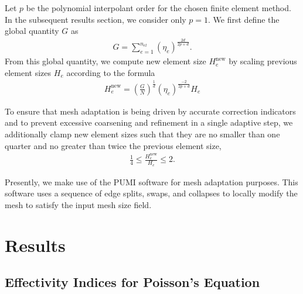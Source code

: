Let $p$ be the polynomial interpolant order for the chosen finite element
method. In the subsequent results section, we consider only $p=1$. We first
define the global quantity $G$ as
%
\begin{gather}
G = \sum_{e=1}^{n_{el}} ( \eta_e ) ^{\frac{2d}{2p+d}}.
\label{eq:refine_global_size}
\end{gather}
%
From this global quantity, we compute new element size $H_e^{\text{new}}$
by scaling previous element sizes $H_e$ according to the formula
%
\begin{gather}
H_e^{\text{new}} = \left( \frac{G}{N} \right)^{\frac{1}{d}}
( \eta_e )^{\frac{-2}{2p + d}} H_e
\label{eq:refine_size_field}
\end{gather}

To ensure that mesh adaptation is being driven by accurate correction indicators
and to prevent excessive coarsening and refinement in a single adaptive step,
we additionally clamp new element sizes such that they are no smaller than one
quarter and no greater than twice the previous element size,
%
\begin{gather}
\frac14 \leq \frac{H_e^{\text{new}}}{H_e} \leq 2.
\label{eq:refine_size_clamping}
\end{gather}

Presently, we make use of the PUMI \cite{ibanez2016pumi} software
for mesh adaptation purposes. This software uses a sequence of edge splits,
swaps, and collapses \cite{li20053d, alauzet2006parallel} to locally modify
the mesh to satisfy the input mesh size field.

\section{Results}

\subsection{Effectivity Indices for Poisson's Equation}

